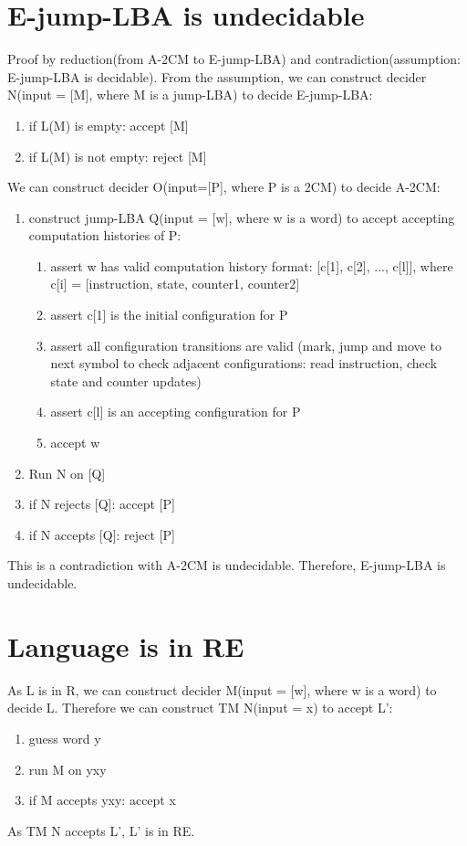 \documentclass{article}
\begin{document}
\section{E-jump-LBA is undecidable}
Proof by reduction(from A-2CM to E-jump-LBA) and contradiction(assumption: E-jump-LBA is decidable). From the assumption, we can construct decider N(input = [M], where M is a jump-LBA) to decide E-jump-LBA:
\begin{enumerate}
	\item if L(M) is empty: accept [M]
	\item if L(M) is not empty: reject [M]
\end{enumerate}
We can construct decider O(input=[P], where P is a 2CM) to decide A-2CM:
\begin{enumerate}
	\item construct jump-LBA Q(input = [w], where w is a word) to accept accepting computation histories of P:
	\begin{enumerate}
		\item assert w has valid computation history format: [c[1], c[2], ..., c[l]], where c[i] = [instruction, state, counter1, counter2]
		\item assert c[1] is the initial configuration for P
		\item assert all configuration transitions are valid (mark, jump and move to next symbol to check adjacent configurations: read instruction, check state and counter updates)
		\item assert c[l] is an accepting configuration for P
		\item accept w
	\end{enumerate}
	\item Run N on [Q]
	\item if N rejects [Q]: accept [P]
	\item if N accepts [Q]: reject [P]
\end{enumerate}
This is a contradiction with A-2CM is undecidable. Therefore, E-jump-LBA is undecidable.

\section{Language is in RE}
As L is in R, we can construct decider M(input = [w], where w is a word) to decide L. Therefore we can construct TM N(input = x) to accept L':
\begin{enumerate}
	\item guess word y
	\item run M on yxy
	\item if M accepts yxy: accept x
\end{enumerate}
As TM N accepts L', L' is in RE.
\end{document}
